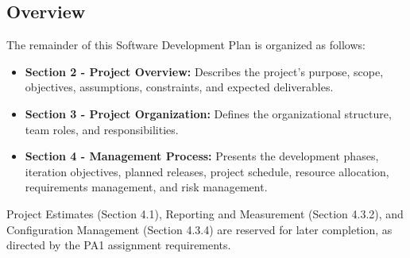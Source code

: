 \subsection{Overview}

The remainder of this Software Development Plan is organized
as follows:

\begin{itemize}
    \item \textbf{Section 2 - Project Overview:}
    Describes the project's purpose, scope, objectives,
    assumptions, constraints, and expected deliverables.

    \item \textbf{Section 3 - Project Organization:}
    Defines the organizational structure, team roles,
    and responsibilities.

    \item \textbf{Section 4 - Management Process:}
    Presents the development phases, iteration objectives,
    planned releases, project schedule, resource allocation,
    requirements management, and risk management.
\end{itemize}

Project Estimates (Section 4.1), Reporting and Measurement
(Section 4.3.2), and Configuration Management (Section 4.3.4)
are reserved for later completion, as directed by the PA1
assignment requirements.
